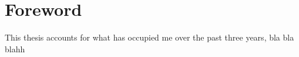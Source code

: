 

\chapter*{Foreword}
 {}

This thesis accounts for what has occupied me over the past three years, bla bla blahh 
